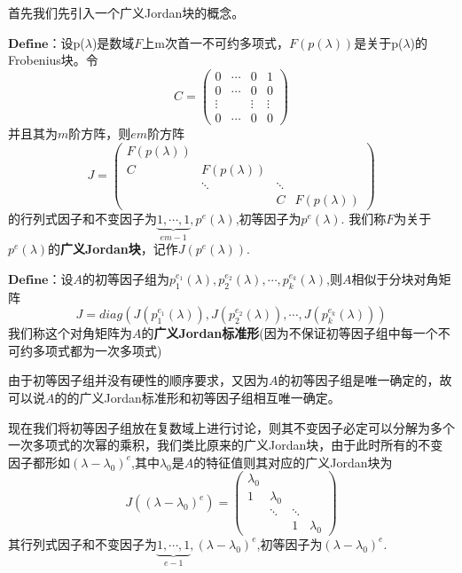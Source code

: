 \documentclass[a4paper,12pt]{book}
\begin{document}
首先我们先引入一个广义Jordan块的概念。

$\mathbf{Define}$：设p($\lambda$)是数域$\mathit{F}$上m次首一不可约多项式，$\mathit{F(p(\lambda))}$是关于p($\lambda$)的Frobenius块。令
\begin{equation*}
	C=
	\begin{pmatrix}
		0  & \cdots & 0 & 1 \\
		0 & \cdots &  0&0 \\
		\vdots&  & \vdots &\vdots \\
		0&  \cdots&0  &0
	\end{pmatrix}
\end{equation*}
并且其为$\mathit{m}$阶方阵，则$\mathit{em}$阶方阵
\begin{equation*}
	J=
	\begin{pmatrix}
		F(p(\lambda)) &  &  & \\
		C &  F(p(\lambda))&  & \\
		& \ddots  &\ddots   & \\
		&  & C&F(p(\lambda))
	\end{pmatrix}
\end{equation*}
的行列式因子和不变因子为$\underset{em-1}{\underbrace{1,\cdots ,1} },p^{e}(\lambda)$,初等因子为$p^{e}(\lambda)$.
我们称$\mathit{F}$为关于$p^{e}(\lambda)$的\textbf{广义Jordan块}，记作$\mathit{J(p^{e}(\lambda))}$.

$\mathbf{Define}$：设$\mathit{A}$的初等因子组为$p_{1}^{e_{1}}(\lambda),p_{2}^{e_{2}}(\lambda),\cdots,p_{k}^{e_{k}}(\lambda)$,则$\mathit{A}$相似于分块对角矩阵
\begin{equation*}
	J=diag(J(p_{1}^{e_{1}}(\lambda )),J(p^{e_{2}}_{2}(\lambda )),\cdots,J(p^{e_{k}}_{k}(\lambda )))
\end{equation*}
我们称这个对角矩阵为$\mathit{A}$的\textbf{广义Jordan标准形}(因为不保证初等因子组中每一个不可约多项式都为一次多项式)

由于初等因子组并没有硬性的顺序要求，又因为$\mathit{A}$的初等因子组是唯一确定的，故可以说$\mathit{A}$的的广义Jordan标准形和初等因子组相互唯一确定。

现在我们将初等因子组放在复数域上进行讨论，则其不变因子必定可以分解为多个一次多项式的次幂的乘积，我们类比原来的广义Jordan块，由于此时所有的不变因子都形如$(\lambda-\lambda_{0})^{e}$,其中$\lambda_{0}$是$\mathit{A}$的特征值则其对应的广义Jordan块为
\begin{equation*}
	J((\lambda-\lambda_{0})^{e})=
\begin{pmatrix}
	 \lambda_{0}&  &  & \\
	1&  \lambda_{0}&  & \\
	& \ddots  &\ddots   & \\
	&  & 1&\lambda_{0}
\end{pmatrix}
\end{equation*}
其行列式因子和不变因子为$\underset{e-1}{\underbrace{1,\cdots ,1} },(\lambda-\lambda_{0})^{e}$,初等因子为$(\lambda-\lambda_{0})^{e}$.
\end{document}
